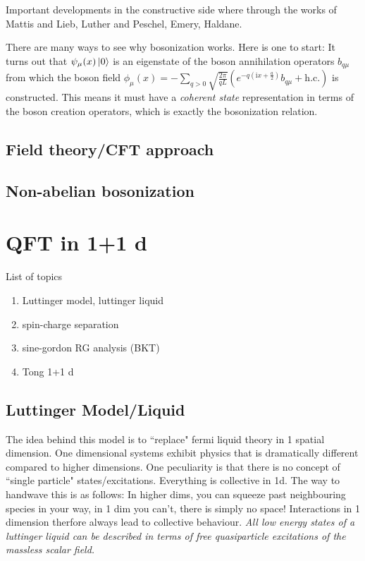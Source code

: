 \documentclass{article}
\renewcommand{\i}{\mathrm{i}}
\renewcommand{\i}{\mathrm{i}}
\begin{document}
Important developments in the constructive side where through the works of Mattis and Lieb, Luther and Peschel, Emery, Haldane.

There are many ways to see why bosonization works. Here is one to start: It turns out that $\psi_{\mu} (x) \ket{0}$ is an eigenstate of the boson annihilation operators $b_{q\mu}$ from which the boson field $\phi_{\mu} (x) = - \sum_{q>0} \sqrt{\frac{2\pi}{qL}}\left(e^{-q(\i x + \frac{a}{2})} b_{q\mu} + \text{h.c.} \right)$ is constructed. This means it must have a \emph{coherent state} representation in terms of the boson creation operators, which is exactly the bosonization relation.

\subsection{Field theory/CFT approach}
\subsection{Non-abelian bosonization}
\section{QFT in 1+1 d}
List of topics
\begin{enumerate}
    \item Luttinger model, luttinger liquid
    \item spin-charge separation
    \item sine-gordon RG analysis (BKT)
    \item Tong 1+1 d
\end{enumerate}
\subsection{Luttinger Model/Liquid}
The idea behind this model is to ``replace" fermi liquid theory in 1 spatial dimension. One dimensional systems exhibit physics that is dramatically different compared to higher dimensions. One peculiarity is that there is no concept of ``single particle" states/excitations. Everything is collective in 1d. The way to handwave this is as follows: In higher dims, you can squeeze past neighbouring species in your way, in 1 dim you can't, there is simply no space! Interactions in 1 dimension therfore always lead to collective behaviour. \emph{All low energy states of a luttinger liquid can be described in terms of free quasiparticle excitations of the massless scalar field.}
\end{document}
